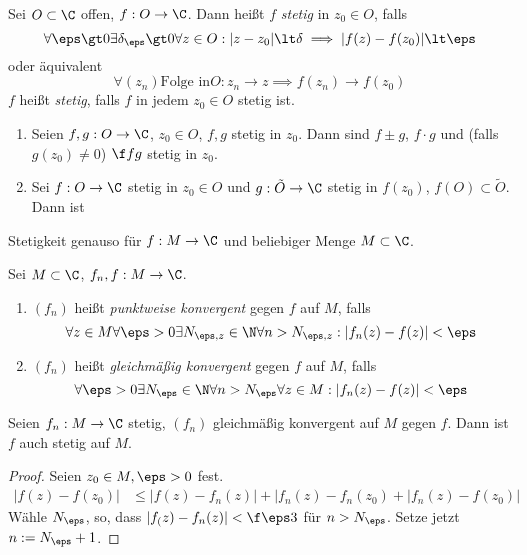 \documentclass[a4paper,10pt]{scrartcl}
\begin{document}
\begin{df}
	\label{df:1.9}
	Sei $O\subset \C$ offen, $f: O \to \C$.
	Dann heißt $f$ \emph{stetig} in $z_0\in O$, falls
	\[
		\forall \eps\gt 0 \exists \delta_\eps \gt 0 \forall z\in O : |z-z_0| \lt \delta \implies |f(z) -f(z_0)| \lt \eps
	\]
	oder äquivalent
	\[
		\forall (z_n) \text{Folge in} O: z_n \to z \implies f(z_n) \to f(z_0)
	\]
	$f$ heißt \emph{stetig}, falls $f$ in jedem $z_0\in O$ stetig ist.
\end{df}

\begin{st}
	\label{st:1.10}
	\begin{enumerate}
		\item 
			Seien $f,g: O\to \C$, $z_0\in O$, $f,g$ stetig in $z_0$.
			Dann sind $f\pm g$, $f\cdot g$ und (falls $g(z_0)\neq 0$) $\f fg$ stetig in $z_0$.
		\item
			Sei $f:O\to \C$ stetig in $z_0\in O$ und $g:\tilde O \to \C$ stetig in $f(z_0)$, $f(O) \subset \tilde O$.
			Dann ist
	\end{enumerate}
\end{st}

\begin{nt}
	\label{nt:1.10}
	Stetigkeit genauso für $f:M\to \C$ und beliebiger Menge $M\subset \C$.
\end{nt}

\begin{df}[Funktionenfolgen]
	Sei $M\subset \C$, $f_n,f: M \to \C$.
	\begin{enumerate}[1)]
		\item 
			$(f_n)$ heißt \emph{punktweise konvergent} gegen $f$ auf $M$, falls
			\[
				\forall z\in M \forall \eps > 0 \exists N_{\eps,z} \in \N \forall n>N_{\eps,z}: |f_n(z) - f(z)| < \eps
			\]
		\item
			$(f_n)$ heißt \emph{gleichmäßig konvergent} gegen $f$ auf $M$, falls
			\[
				\forall \eps>0 \exists N_{\eps} \in \N \forall n>N_{\eps} \forall z\in M : |f_n(z)-f(z)| < \eps
			\]
	\end{enumerate}
\end{df}

\begin{st}
	\label{st:1.12}
	Seien $f_n:M\to \C$ stetig, $(f_n)$ gleichmäßig konvergent auf $M$ gegen $f$. 
	Dann ist $f$ auch stetig auf $M$.
	\begin{proof}
		Seien $z_0\in M, \eps > 0$ fest.
		\begin{align*}
			|f(z)-f(z_0)| &\le |f(z)-f_n(z)| + |f_n(z)-f_n(z_0) + |f_n(z)-f(z_0)|
		\end{align*}
		Wähle $N_{\eps}$, so, dass $|f_(z)-f_n(z)| < \f \eps 3$ für $n>N_{\eps}$.
		Setze jetzt $n:= N_{\eps}+1$.
	\end{proof}
\end{st}
\end{document}
